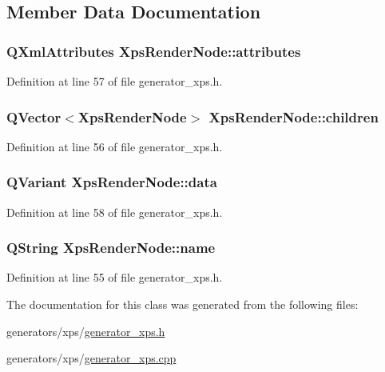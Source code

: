 \subsection{Member Data Documentation}
\hypertarget{classXpsRenderNode_a7f6fca2e06dd119e7eb20139af6c8477}{
\subsubsection[{attributes}]{\setlength{\rightskip}{0pt plus 5cm}Q\+Xml\+Attributes Xps\+Render\+Node\+::attributes}}\label{classXpsRenderNode_a7f6fca2e06dd119e7eb20139af6c8477}


Definition at line 57 of file generator\+\_\+xps.\+h.

\hypertarget{classXpsRenderNode_a8a1cc47feef96fa119b2491e60ebeb09}{
\subsubsection[{children}]{\setlength{\rightskip}{0pt plus 5cm}Q\+Vector$<${\bf Xps\+Render\+Node}$>$ Xps\+Render\+Node\+::children}}\label{classXpsRenderNode_a8a1cc47feef96fa119b2491e60ebeb09}


Definition at line 56 of file generator\+\_\+xps.\+h.

\hypertarget{classXpsRenderNode_a1b07b9ac5eb86bec6d9f94ec5c855065}{
\subsubsection[{data}]{\setlength{\rightskip}{0pt plus 5cm}Q\+Variant Xps\+Render\+Node\+::data}}\label{classXpsRenderNode_a1b07b9ac5eb86bec6d9f94ec5c855065}


Definition at line 58 of file generator\+\_\+xps.\+h.

\hypertarget{classXpsRenderNode_a7b3d33b9669c0235e095d5efc870ccf0}{
\subsubsection[{name}]{\setlength{\rightskip}{0pt plus 5cm}Q\+String Xps\+Render\+Node\+::name}}\label{classXpsRenderNode_a7b3d33b9669c0235e095d5efc870ccf0}


Definition at line 55 of file generator\+\_\+xps.\+h.



The documentation for this class was generated from the following files\+:\begin{DoxyCompactItemize}
\item 
generators/xps/\hyperlink{generator__xps_8h}{generator\+\_\+xps.\+h}\item 
generators/xps/\hyperlink{generator__xps_8cpp}{generator\+\_\+xps.\+cpp}\end{DoxyCompactItemize}
